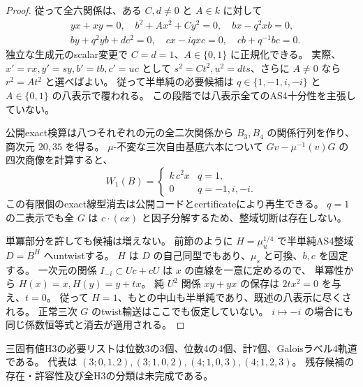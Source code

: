 \begin{proof}
従って全六関係は、ある $C,d\ne0$ と $A\in k$ に対して
\begin{align*}
 &yx+xy=0,\quad b^2+A x^2+C y^2=0,\quad bx-q^2xb=0,\\
 &by+q^2yb+d c^2=0,\quad cx-iqxc=0,\quad cb+q^{-1}bc=0.
\end{align*}
独立な生成元のscalar変更で $C=d=1$、$A\in\{0,1\}$ に正規化できる。
実際、$x'=r x,y'=s y,b'=t b,c'=u c$ として
$s^2=Ct^2,u^2=dts$、さらに $A\ne0$ なら $r^2=At^2$ と選べばよい。
従って半単純の必要候補は $q\in\{1,-1,i,-i\}$ と $A\in\{0,1\}$ の八表示で覆われる。
この段階では八表示全てのAS4十分性を主張していない。

公開exact検算は八つそれぞれの元の全二次関係から
$B_3,B_4$ の関係行列を作り、商次元 $20,35$ を得る。
$\mu$-不変な三次自由基底六本について $Gv-\mu^{-1}(v)G$ の四次商像を計算すると、
\[
 W_1(B)=\begin{cases}k\,c^2x&q=1,\\0&q=-1,i,-i.\end{cases}
\]
この有限個のexact線型消去は公開コードとcertificateにより再生できる。
$q=1$ の二表示でも全 $G$ は $c\cdot(cx)$ と因子分解するため、整域切断は存在しない。

単冪部分を許しても候補は増えない。
前節のように $H=\mu_u^{1/4}$ で半単純AS4整域 $D=B^H$ へuntwistする。
$H$ は $D$ の自己同型でもあり、$\mu_s$ と可換、$b,c$ を固定する。
一次元の関係 $I_{-i}\subset Uc+cU$ は $x$ の直線を一意に定めるので、
単冪性から $H(x)=x,H(y)=y+t x$。
純 $U^2$ 関係 $xy+yx$ の保存は $2t x^2=0$ を与え、$t=0$。
従って $H=1$、もとの中山も半単純であり、既述の八表示に尽くされる。
正常三次 $G$ のtwist輸送はここでも仮定していない。
$i\mapsto-i$ の場合にも同じ係数恒等式と消去が適用される。
\end{proof}

\begin{corollary}[三固有値の七個の必要スペクトル]
\label{cor:cubic-three-eigenvalue-7-list}
三固有値H3の必要リストは位数3の3個、位数4の4個、計7個、Galoisラベル4軌道である。
代表は $(3;0,1,2),(3;1,0,2),(4;1,0,3),(4;1,2,3)$。
残存候補の存在・許容性及び全H3の分類は未完成である。
\end{corollary}
